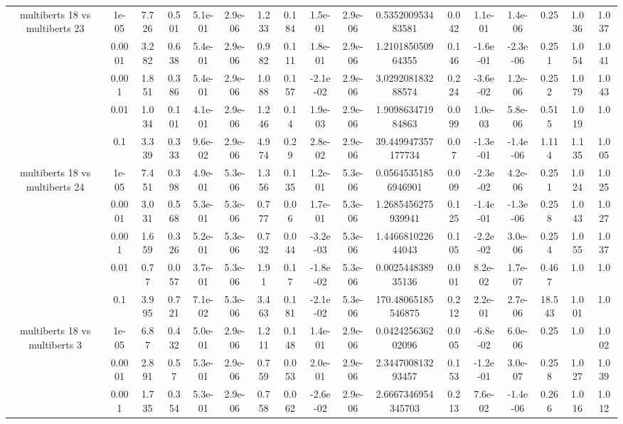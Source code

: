 \begin{tabular}{|c|c|c|c|c|c|c|c|c|c|c|c|c|c|c|c|c|}
\hline
\multirow{5}{*}{multiberts 18 vs multiberts 23} & 1e-05 & 7.726 & 0.501 & 5.1e-01 & 2.9e-06 & 1.233 & 0.184 & 1.5e-01 & 2.9e-06 & 0.535200953483581 & 0.042 & 1.1e-01 & 1.4e-06 & 0.25 & 1.036 & 1.037 \\
 & 0.0001 & 3.282 & 0.638 & 5.4e-01 & 2.9e-06 & 0.982 & 0.111 & 1.8e-01 & 2.9e-06 & 1.210185050964355 & 0.146 & -1.6e-01 & -2.3e-06 & 0.251 & 1.054 & 1.041 \\
 & 0.001 & 1.851 & 0.386 & 5.4e-01 & 2.9e-06 & 1.088 & 0.157 & -2.1e-02 & 2.9e-06 & 3.029208183288574 & 0.224 & -3.6e-02 & 1.2e-06 & 0.252 & 1.079 & 1.043 \\
 & 0.01 & 1.034 & 0.101 & 4.1e-01 & 2.9e-06 & 1.246 & 0.14 & 1.9e-03 & 2.9e-06 & 1.909863471984863 & 0.099 & 1.0e-03 & 5.8e-06 & 0.515 & 1.019 & 1.0 \\
 & 0.1 & 3.339 & 0.333 & 9.6e-02 & 2.9e-06 & 4.974 & 0.29 & 2.8e-02 & 2.9e-06 & 39.449947357177734 & 0.07 & -1.3e-01 & -1.4e-06 & 1.114 & 1.135 & 1.005 \\
\hline
\multirow{5}{*}{multiberts 18 vs multiberts 24} & 1e-05 & 7.451 & 0.398 & 4.9e-01 & 5.3e-06 & 1.356 & 0.135 & 1.2e-01 & 5.3e-06 & 0.05645351856946901 & 0.009 & -2.3e-02 & 4.2e-06 & 0.251 & 1.024 & 1.025 \\
 & 0.0001 & 3.031 & 0.568 & 5.3e-01 & 5.3e-06 & 0.777 & 0.06 & 1.7e-01 & 5.3e-06 & 1.2685456275939941 & 0.125 & -1.4e-01 & -1.3e-06 & 0.258 & 1.043 & 1.027 \\
 & 0.001 & 1.659 & 0.326 & 5.2e-01 & 5.3e-06 & 0.732 & 0.044 & -3.2e-03 & 5.3e-06 & 1.446681022644043 & 0.105 & -2.2e-02 & 3.0e-06 & 0.254 & 1.055 & 1.037 \\
 & 0.01 & 0.77 & 0.057 & 3.7e-01 & 5.3e-06 & 1.91 & 0.17 & -1.8e-02 & 5.3e-06 & 0.002544838935136 & 0.001 & 8.2e-02 & 1.7e-07 & 0.467 & 1.0 & 1.0 \\
 & 0.1 & 3.995 & 0.721 & 7.1e-02 & 5.3e-06 & 3.463 & 0.181 & -2.1e-02 & 5.3e-06 & 170.48065185546875 & 0.212 & 2.2e-01 & 2.7e-06 & 18.543 & 1.001 & 1.0 \\
\hline
\multirow{5}{*}{multiberts 18 vs multiberts 3} & 1e-05 & 6.87 & 0.432 & 5.0e-01 & 2.9e-06 & 1.211 & 0.148 & 1.4e-01 & 2.9e-06 & 0.042425636202096 & 0.005 & -6.8e-02 & 6.0e-06 & 0.25 & 1.0 & 1.002 \\
 & 0.0001 & 2.891 & 0.57 & 5.3e-01 & 2.9e-06 & 0.759 & 0.053 & 2.0e-01 & 2.9e-06 & 2.344700813293457 & 0.153 & -1.2e-01 & 3.0e-07 & 0.258 & 1.027 & 1.039 \\
 & 0.001 & 1.735 & 0.354 & 5.3e-01 & 2.9e-06 & 0.758 & 0.062 & -2.6e-02 & 2.9e-06 & 2.6667346954345703 & 0.213 & 7.6e-02 & -1.4e-06 & 0.266 & 1.016 & 1.012 \\

\end{tabular}
